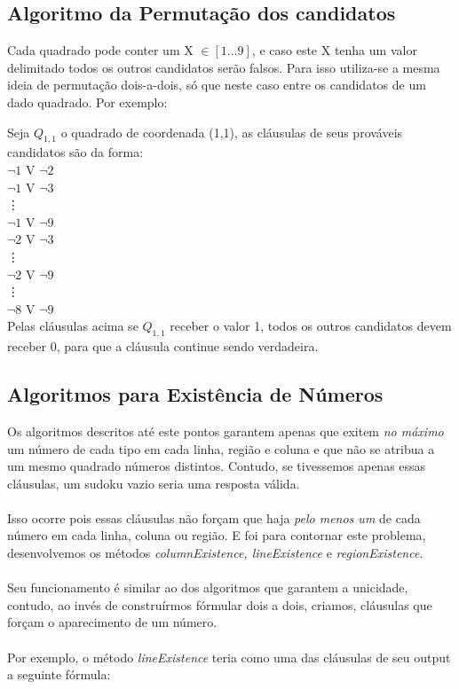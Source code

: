 \documentclass[a4paper]{article}
\begin{document}
\subsection{Algoritmo da Permutação dos candidatos}
Cada quadrado pode conter um X $\in [1 \dots 9]$, e caso este X tenha um valor delimitado todos os outros candidatos serão falsos. Para isso utiliza-se a mesma ideia de permutação dois-a-dois, só que neste caso entre os candidatos de um dado quadrado. Por exemplo:

Seja $Q_{1,1}$ o quadrado de coordenada (1,1), as cláusulas de seus prováveis candidatos são da forma:\\
$\neg 1$  V  $\neg 2$\\
$\neg 1$  V  $\neg 3$\\
\vdots \\
$\neg 1$  V  $\neg 9$\\
$\neg 2$  V  $\neg 3$\\
\vdots\\
$\neg 2$  V  $\neg 9$\\
\vdots\\
$\neg 8$  V  $\neg 9$\\

Pelas cláusulas acima se $Q_{1,1}$ receber o valor 1, todos os outros candidatos devem receber 0, para que a cláusula continue sendo verdadeira.




\subsection{Algoritmos para Existência de Números}
Os algoritmos descritos até este pontos garantem apenas que exitem \textit{no máximo} um número de cada tipo em cada linha, região e coluna e que não se atribua a um mesmo quadrado números distintos. Contudo, se tivessemos apenas essas cláusulas, um sudoku vazio seria uma resposta válida.\\\\
Isso ocorre pois essas cláusulas não forçam que haja \textit{pelo menos um} de cada número em cada linha, coluna ou região. E foi para contornar este problema, desenvolvemos os métodos \textit{columnExistence, lineExistence} e \textit{regionExistence}.\\\\
Seu funcionamento é similar ao dos algoritmos que garantem a unicidade, contudo, ao invés de construírmos fórmular dois a dois, criamos, cláusulas que forçam o aparecimento de um número.\\\\
Por exemplo, o método \textit{lineExistence} teria como uma das cláusulas de seu output a seguinte fórmula:\\
\end{document}

